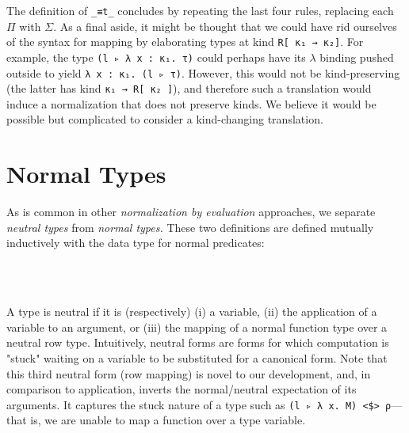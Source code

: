 \documentclass[authoryear, acmsmall, screen, review, nonacm]{acmart}
\begin{document}
The definition of \verb!_≡t_! concludes by repeating the last four rules, replacing each $\Pi$ with $\Sigma$. As a final aside, it might be thought that we could have rid ourselves of the syntax for mapping by elaborating types at kind \verb!R[ κ₁ → κ₂]!. For example, the type \verb!(l ▹ λ x : κ₁. τ)! could perhaps have its $\lambda$ binding pushed outside to yield \verb!λ x : κ₁. (l ▹ τ)!. However, this would not be kind-preserving (the latter has kind \verb!κ₁ → R[ κ₂ ]!), and therefore such a translation would induce a normalization that does not preserve kinds. We believe it would be possible but complicated to consider a kind-changing translation.

\section{Normal Types}

As is common in other \emph{normalization by evaluation} approaches, we separate \emph{neutral types} from \emph{normal types.} These two definitions are defined mutually inductively with the data type for normal predicates:
\begin{code}[hide]%
\>[0]\AgdaSpace{}%
\AgdaSpace{}%
\<%
\end{code}
\begin{code}%
\>[0]\AgdaSpace{}%
\AgdaSpace{}%
\AgdaSymbol{(}\AgdaSpace{}%
\AgdaSymbol{:}\AgdaSpace{}%
\AgdaSymbol{)}\AgdaSpace{}%
\AgdaSymbol{:}\AgdaSpace{}%
\AgdaSpace{}%
\AgdaSpace{}%
\<%
\\
\>[0]\AgdaSpace{}%
\AgdaSpace{}%
\AgdaSymbol{(}\AgdaSpace{}%
\AgdaSymbol{:}\AgdaSpace{}%
\AgdaSymbol{)}\AgdaSpace{}%
\AgdaSymbol{:}\AgdaSpace{}%
\AgdaSpace{}%
\AgdaSpace{}%
\<%
\\
\>[0]\AgdaSpace{}%
\AgdaSpace{}%
\AgdaSpace{}%
\AgdaSymbol{:}\AgdaSpace{}%
\AgdaSpace{}%
\AgdaSpace{}%
\<%
\end{code}

A type is neutral if it is (respectively) (i) a variable, (ii) the application of a variable to an argument, or (iii) the mapping of a normal function type over a neutral row type. Intuitively, neutral forms are forms for which computation is "stuck" waiting on a variable to be substituted for a canonical form. Note that this third neutral form (row mapping) is novel to our development, and, in comparison to application, inverts the normal/neutral expectation of its arguments. It captures the stuck nature of a type such as \verb!(l ▹ λ x. M) <$> ρ!---that is, we are unable to map a function over a type variable.
\end{document}
